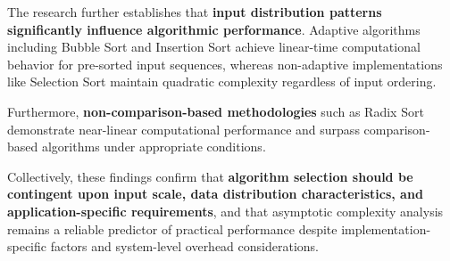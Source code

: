 \documentclass[12pt,a4paper]{article}
\begin{document}
The research further establishes that \textbf{input distribution patterns significantly influence algorithmic performance}. Adaptive algorithms including Bubble Sort and Insertion Sort achieve linear-time computational behavior for pre-sorted input sequences, whereas non-adaptive implementations like Selection Sort maintain quadratic complexity regardless of input ordering.

Furthermore, \textbf{non-comparison-based methodologies} such as Radix Sort demonstrate near-linear computational performance and surpass comparison-based algorithms under appropriate conditions.

Collectively, these findings confirm that \textbf{algorithm selection should be contingent upon input scale, data distribution characteristics, and application-specific requirements}, and that asymptotic complexity analysis remains a reliable predictor of practical performance despite implementation-specific factors and system-level overhead considerations.
\end{document}
